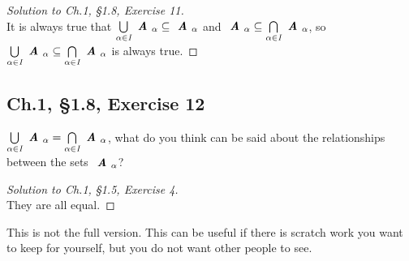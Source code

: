 \documentclass[12pt]{amsart}
\numberwithin{equation}{section}
\theoremstyle{definition}
\theoremstyle{remark}
\newif\ifnotes
\begin{document}
\begin{proof}[Solution to Ch.1, \S 1.8,  Exercise 11] \ \\

It is always true that $ \bigcup\limits_{ \alpha \in \textit{I} } \textbf{ \textit{A} }_{ \alpha } \subseteq \textbf{ \textit{A} }_{ \alpha } $ and $ \textbf{ \textit{A} }_{ \alpha } \subseteq \bigcap\limits_{ \alpha \in \textit{I} } \textbf{ \textit{A} }_{ \alpha } $, so $ \bigcup\limits_{ \alpha \in \textit{I} } \textbf{ \textit{A} }_{ \alpha } \subseteq \bigcap\limits_{ \alpha \in \textit{I} } \textbf{ \textit{A} }_{ \alpha } $ is always true.

\end{proof}



\subsection*{Ch.1, \S 1.8,  Exercise 12} $ \bigcup\limits_{ \alpha \in \textit{I} } \textbf{ \textit{A} }_{ \alpha } = \bigcap\limits_{ \alpha \in \textit{I} } \textbf{ \textit{A} }_{ \alpha } $, what do you think can be said about the relationships between the sets $\textbf{ \textit{A} }_{ \alpha }$?

\begin{proof}[Solution to Ch.1, \S 1.5,  Exercise 4] \ \\

They are all equal.

\end{proof}




\ifnotes


\else
	This is not the full version.  This can be useful if there is scratch work you want to keep for yourself, but you do not want other people to see. 
\fi





\end{document}
